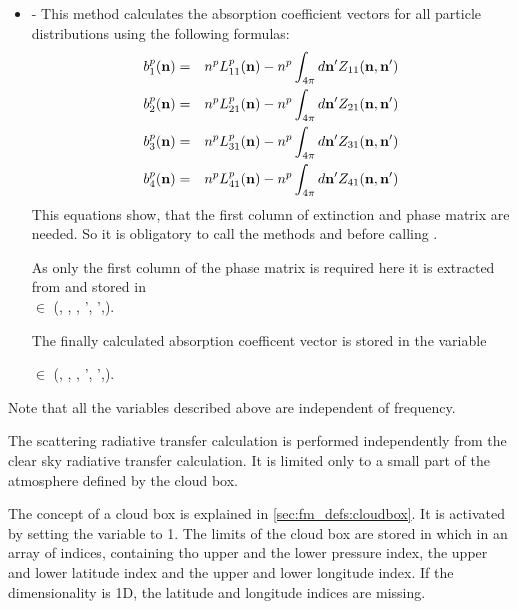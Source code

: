 \begin{itemize}
 
\item {} - This method calculates the
  absorption coefficient vectors \SAbVec for all particle distributions using
  the following formulas:
  \begin{eqnarray}
    \label{eq:gen_abs_vector}
b^p_1({\bf n}) &=& n^p L^p_{11}({\bf n}) - n^p \int_{4\pi} d{\bf n'}
Z_{11}({\bf n, n'})\\
b^p_2({\bf n}) &=& n^p L^p_{21}({\bf n}) - n^p \int_{4\pi} d{\bf n'}
Z_{21}({\bf n, n'})\\
b^p_3({\bf n}) &=& n^p L^p_{31}({\bf n}) - n^p \int_{4\pi} d{\bf n'}
Z_{31}({\bf n, n'})\\
b^p_4({\bf n}) &=& n^p L^p_{41}({\bf n}) - n^p \int_{4\pi} d{\bf n'}
Z_{41}({\bf n, n'})
  \end{eqnarray}
This equations show, that the first column of extinction and phase
matrix are needed. So it is obligatory to call the methods
 and 
 before calling
. 

As only the first column of the phase matrix  is required here it is
extracted from  and  stored in \\
 $\in$ (\IPart, \ScaZa, \ScaAa, \ScaZa', \ScaAa',\IAmp).

The finally calculated absorption coefficent vector is stored in the
variable
\begin{center}
 $\in$ (\IPart, \ScaZa, \ScaAa, \ScaZa',
\ScaAa',).  
\end{center}
\end{itemize}
Note that all the variables described above are
independent of frequency. 

\label{sec:scattering:scat_meth_rt}

The scattering radiative transfer calculation is performed
independently from the clear sky radiative transfer calculation. It is
limited only to a small part of the atmosphere defined by the cloud box.

\label{sec:scattering:cloudbox}

The concept of a cloud box is explained in
\ref{sec:fm_defs:cloudbox}. It is activated by setting the variable
 to 1. The
limits of the cloud box are stored in 
which in an array of indices, containing tho upper and the lower
pressure index, the upper and lower latitude index and the upper and
lower longitude index. If the dimensionality is 1D, the latitude and longitude
indices are missing.

